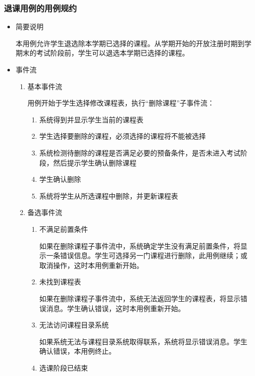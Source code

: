\subsubsection{退课用例的用例规约}
\begin{itemize}
  \item 简要说明
  
  \CJKindent 本用例允许学生退选除本学期已选择的课程。从学期开始的开放注册时期到学期末的考试阶段前，学生可以退选本学期已选择的课程。
  
  \item 事件流
  \begin{enumerate}
    \item 基本事件流
    
    \CJKindent 用例开始于学生选择修改课程表，执行“删除课程”子事件流：
    \begin{enumerate}[(1)]
      \item 系统得到并显示学生当前的课程表
      \item 学生选择要删除的课程，必须选择的课程将不能被选择
      \item 系统检测待删除的课程是否满足必要的预备条件，是否未进入考试阶段，然后提示学生确认删除课程
      \item 学生确认删除
      \item 系统将学生从所选课程中删除，并更新课程表
    \end{enumerate}
    
    \item 备选事件流
    
    \begin{enumerate}[{2}.1]
      \item 不满足前置条件
      
      \CJKindent 如果在删除课程子事件流中，系统确定学生没有满足前置条件，将显示一条错误信息。学生可选择另一门课程进行删除，此用例继续；或取消操作，这时本用例重新开始。
      
      \item 未找到课程表
      
      \CJKindent 如果在删除课程子事件流中，系统无法返回学生的课程表，将显示错误消息。学生确认错误，这时本用例重新开始。

      \item 无法访问课程目录系统
      
      \CJKindent 如果系统无法与课程目录系统取得联系，系统将显示错误消息。学生确认错误，本用例终止。
      
      \item 选课阶段已结束
      

\end{enumerate}
\end{enumerate}
\end{itemize}
